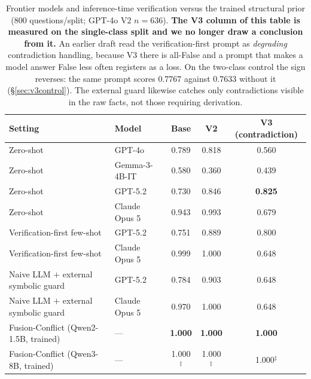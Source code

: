 \documentclass{article}
\begin{document}
\begin{table}[h]
\centering\small
\caption{Frontier models and inference-time verification versus the trained structural prior ($800$ questions/split; GPT-4o V2 $n{=}636$). \textbf{The V3 column of this table is measured on the single-class split and we no longer draw a conclusion from it.} An earlier draft read the verification-first prompt as \emph{degrading} contradiction handling, because V3 there is all-False and a prompt that makes a model answer False less often registers as a loss. On the two-class control the sign reverses: the same prompt scores $0.7767$ against $0.7633$ without it (\S\ref{sec:v3control}). The external guard likewise catches only contradictions visible in the raw facts, not those requiring derivation.}
\label{tab:frontier_prompt}
\begin{tabular}{llccc}
\toprule
\textbf{Setting} & \textbf{Model} & \textbf{Base} & \textbf{V2} & \textbf{V3 (contradiction)} \\
\midrule
Zero-shot & GPT-4o & 0.789 & 0.818 & 0.560 \\
Zero-shot & Gemma-3-4B-IT & 0.580 & 0.360 & 0.439 \\
Zero-shot & GPT-5.2 & 0.730 & 0.846 & \textbf{0.825} \\
Zero-shot & Claude Opus 5 & 0.943 & 0.993 & 0.679 \\
\midrule
Verification-first few-shot & GPT-5.2 & 0.751 & 0.889 & 0.800 \\
Verification-first few-shot & Claude Opus 5 & 0.999 & 1.000 & 0.648 \\
\midrule
Naive LLM $+$ external symbolic guard & GPT-5.2 & 0.784 & 0.903 & 0.648 \\
Naive LLM $+$ external symbolic guard & Claude Opus 5 & 0.970 & 1.000 & 0.648 \\
\midrule
\rowcolor{gray!10} Fusion-Conflict (Qwen2-1.5B, trained) & --- & \textbf{1.000} & \textbf{1.000} & \textbf{1.000} \\
\rowcolor{gray!10} Fusion-Conflict (Qwen3-8B, trained) & --- & 1.000$^{\ddagger}$ & 1.000$^{\ddagger}$ & 1.000$^{\ddagger}$ \\
\bottomrule
\end{tabular}
\end{table}
\end{document}
